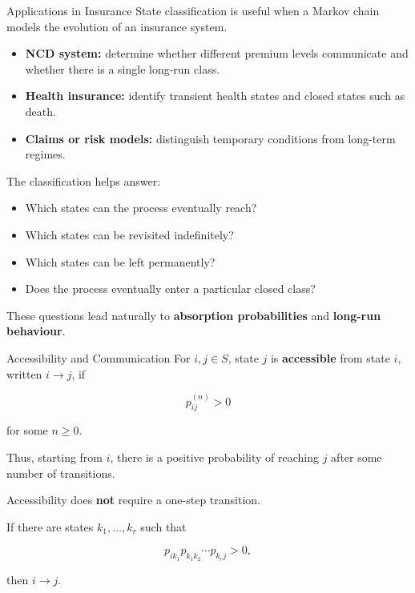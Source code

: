 \documentclass[
  ignorenonframetext,
  aspectratio=169,
]{beamer}
\providecommand{\tightlist}{%
  \setlength{\itemsep}{0pt}\setlength{\parskip}{0pt}}
\begin{document}
\begin{frame}{Applications in Insurance}
\protect{}\label{applications-in-insurance}
State classification is useful when a Markov chain models the evolution
of an insurance system.

\begin{itemize}
\tightlist
\item
  \textbf{NCD system:} determine whether different premium levels
  communicate and whether there is a single long-run class.
\item
  \textbf{Health insurance:} identify transient health states and closed
  states such as death.
\item
  \textbf{Claims or risk models:} distinguish temporary conditions from
  long-term regimes.
\end{itemize}

The classification helps answer:

\begin{itemize}
\tightlist
\item
  Which states can the process eventually reach?
\item
  Which states can be revisited indefinitely?
\item
  Which states can be left permanently?
\item
  Does the process eventually enter a particular closed class?
\end{itemize}

These questions lead naturally to \textbf{absorption probabilities} and
\textbf{long-run behaviour}.
\end{frame}

\begin{frame}{Accessibility and Communication}
\protect{}\label{accessibility-and-communication}
For \(i,j\in S\), state \(j\) is \textbf{accessible} from state \(i\),
written \(i\rightarrow j\), if

\[
p_{ij}^{(n)}>0
\]

for some \(n\geq0\).

Thus, starting from \(i\), there is a positive probability of reaching
\(j\) after some number of transitions.

Accessibility does \textbf{not} require a one-step transition.

If there are states \(k_1,\ldots,k_r\) such that

\[
p_{ik_1}p_{k_1k_2}\cdots p_{k_rj}>0,
\]

then \(i\rightarrow j\).
\end{frame}
\end{document}
